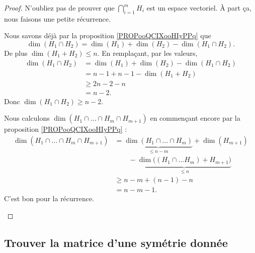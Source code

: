 \begin{proof}
	N'oubliez pas de prouver que \( \bigcap_{i=1}^mH_i\) est un espace vectoriel. À part ça, nous faisons une petite récurrence.
	\begin{subproof}
		\spitem[Pour \( m=2\)]
		Nous savons déjà par la proposition \ref{PROPooQCIXooHIyPPq} que
		\begin{equation}
			\dim(H_1\cap H_2)=\dim(H_1)+\dim(H_2)-\dim(H_1\cap H_2).
		\end{equation}
		De plus \( \dim(H_1+H_2)\leq n\). En remplaçant, par les valeurs,
		\begin{subequations}
			\begin{align}
				\dim(H_1\cap H_2) & =\dim(H_1)+\dim(H_2)-\dim(H_1\cap H_2) \\
				                  & =n-1+n-1-\dim(H_1+H_2)                 \\
				                  & \geq 2n-2-n                            \\
				                  & =n-2.
			\end{align}
		\end{subequations}
		Donc \( \dim(H_1\cap H_2)\geq n-2\).

		\spitem[La récurrence]
		Nous calculons \( \dim(H_1\cap\ldots\cap H_m\cap H_{m+1})\) en commençant encore par la proposition \ref{PROPooQCIXooHIyPPq} :
		\begin{subequations}
			\begin{align}
				\dim(H_1\cap \ldots\cap H_m\cap H_{m+1}) & =\underbrace{\dim(H_1\cap\ldots\cap H_m)}_{\leq n-m}+\dim(H_{m+1})        \\
				                                         & \qquad -\underbrace{\dim\big( (H_1\cap\ldots H_m)+H_{m+1} \big)}_{\leq n} \\
				                                         & \geq n-m+(n-1)-n                                                          \\
				                                         & =n-m-1.
			\end{align}
		\end{subequations}
		C'est bon pour la récurrence.
	\end{subproof}
\end{proof}

\subsection{Trouver la matrice d'une symétrie donnée}
\label{SubSecMtrSym}

